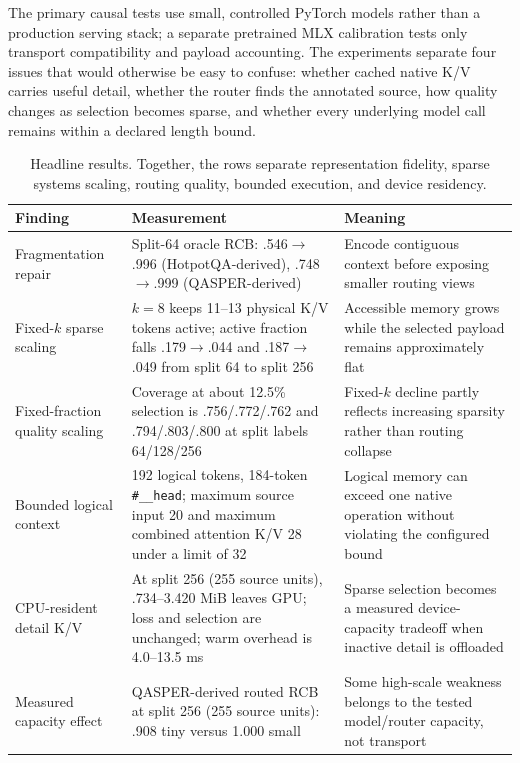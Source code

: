 \documentclass[11pt]{article}
\begin{document}
The primary causal tests use small, controlled PyTorch models rather than a production
serving stack; a separate pretrained MLX calibration tests only transport compatibility
and payload accounting. The experiments separate four issues that would otherwise be easy
to confuse: whether cached native K/V carries useful detail, whether the router finds the
annotated source, how quality changes as selection becomes sparse, and whether every
underlying model call remains within a declared length bound.

\begin{table}[H]
\centering
\footnotesize
\caption{Headline results. Together, the rows separate representation fidelity, sparse
systems scaling, routing quality, bounded execution, and device residency.}
\label{tab:headline}
\begin{tabularx}{\textwidth}{P{0.22\textwidth}P{0.31\textwidth}Y}
\toprule
Finding & Measurement & Meaning \\
\midrule
Fragmentation repair & Split-64 oracle RCB: .546$\rightarrow$.996
(HotpotQA-derived), .748$\rightarrow$.999 (QASPER-derived) & Encode contiguous context
before exposing smaller routing views \\
Fixed-$k$ sparse scaling & $k=8$ keeps 11--13 physical K/V tokens active; active fraction
falls .179$\rightarrow$.044 and .187$\rightarrow$.049 from split 64 to split 256 & Accessible
memory grows while the selected payload remains approximately flat \\
Fixed-fraction quality scaling & Coverage at about 12.5\% selection is
.756/.772/.762 and .794/.803/.800 at split labels 64/128/256 & Fixed-$k$ decline partly reflects
increasing sparsity rather than routing collapse \\
Bounded logical context & 192 logical tokens, 184-token \texttt{\#\_\_head}; maximum source
input 20 and maximum combined attention K/V 28 under a limit of 32 & Logical memory can exceed one native
operation without violating the configured bound \\
CPU-resident detail K/V & At split 256 (255 source units), .734--3.420 MiB leaves GPU; loss and selection are
unchanged; warm overhead is 4.0--13.5 ms & Sparse selection becomes a measured device-capacity
tradeoff when inactive detail is offloaded \\
Measured capacity effect & QASPER-derived routed RCB at split 256 (255 source units): .908 tiny versus 1.000
small & Some high-scale weakness belongs to the tested model/router capacity, not transport \\
\bottomrule
\end{tabularx}
\end{table}
\end{document}

